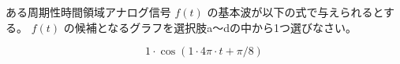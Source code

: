ある周期性時間領域アナログ信号 $f(t)$ の基本波が以下の式で与えられるとする。
$f(t)$ の候補となるグラフを選択肢a〜dの中から1つ選びなさい。

\[
1 \cdot \cos( 1 \cdot 4\pi \cdot t + \pi/8 )
\]
